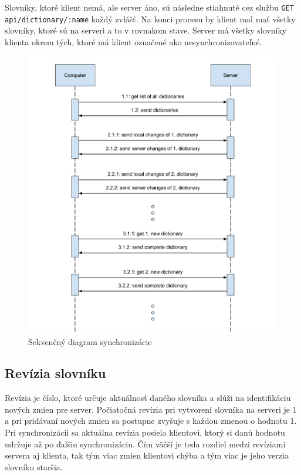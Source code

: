 \documentclass[
  digital, %
  table,   %
  lof,     %
  lot,     %
]{fithesis3}
\begin{document}
Slovníky, ktoré klient nemá, ale server áno, sú následne stiahnuté cez službu \texttt{GET api/dictionary/:name} každý zvlášť. Na konci procesu by klient mal mať všetky slovníky, ktoré sú na serveri a to v rovnakom stave. Server má všetky slovníky klienta okrem tých, ktoré má klient označené ako nesynchronizovateľné.

\begin{figure}
	\begin{center}
	\includegraphics[width=\textwidth]{img/synchronisation.png}
	\end{center}
    \caption{Sekvenčný diagram synchronizácie}
	\label{fig:synchronisation}
\end{figure}

\subsection{Revízia slovníku}
Revízia je číslo, ktoré určuje aktuálnosť daného slovníka a slúži na identifikáciu nových zmien pre server. Počiatočná revízia pri vytvorení slovníka na serveri je 1 a pri pridávaní nových zmien sa postupne zvyšuje s každou zmenou o hodnotu 1. Pri synchronizácii sa aktuálna revízia posiela klientovi, ktorý si danú hodnotu udržuje až po ďalšiu synchronizáciu. Čím väčší je teda rozdiel medzi revíziami servera aj klienta, tak tým viac zmien klientovi chýba a tým viac je jeho verzia slovníku staršia.
\end{document}
